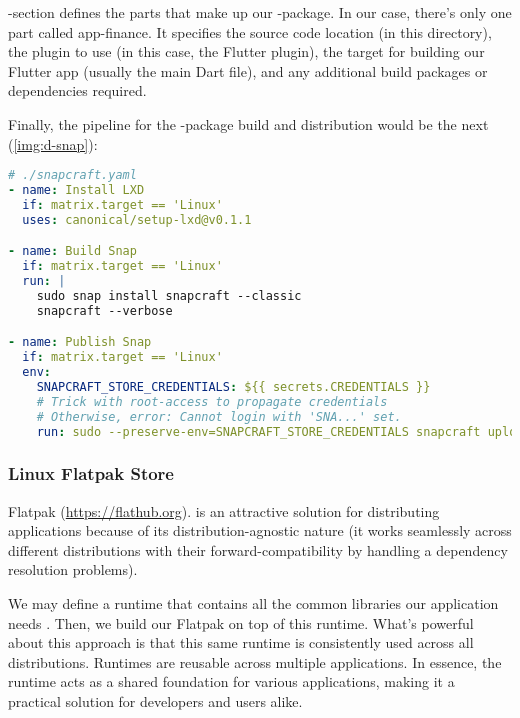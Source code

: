 \noindent {}-section defines the parts that make up our -package. In our case, there's only one part 
called app-finance. It specifies the source code location (in this directory), the plugin to use (in this case, the 
Flutter plugin), the target for building our Flutter app (usually the main Dart file), and any additional build 
packages or dependencies required.

Finally, the pipeline for the -package build and distribution would be the next  (\cref{img:d-snap}):

\begin{lstlisting}[language=yaml]
# ./snapcraft.yaml
- name: Install LXD
  if: matrix.target == 'Linux'
  uses: canonical/setup-lxd@v0.1.1

- name: Build Snap
  if: matrix.target == 'Linux'
  run: |
    sudo snap install snapcraft --classic
    snapcraft --verbose

- name: Publish Snap
  if: matrix.target == 'Linux'
  env:
    SNAPCRAFT_STORE_CREDENTIALS: ${{ secrets.CREDENTIALS }}
    # Trick with root-access to propagate credentials
    # Otherwise, error: Cannot login with 'SNA...' set.
    run: sudo --preserve-env=SNAPCRAFT_STORE_CREDENTIALS snapcraft upload *.snap --release=latest/stable
\end{lstlisting}



\subsubsection{Linux Flatpak Store}

Flatpak (\href{https://flathub.org}{https://flathub.org}). is an attractive solution for distributing applications 
because of its distribution-agnostic nature (it works seamlessly across different distributions with their 
forward-compatibility by handling a dependency resolution problems).

We may define a runtime that contains all the common libraries our application needs . Then, we build our 
Flatpak on top of this runtime. What's powerful about this approach is that this same runtime is consistently used 
across all distributions. Runtimes are reusable across multiple applications. In essence, the runtime acts as a 
shared foundation for various applications, making it a practical solution for developers and users alike. 

